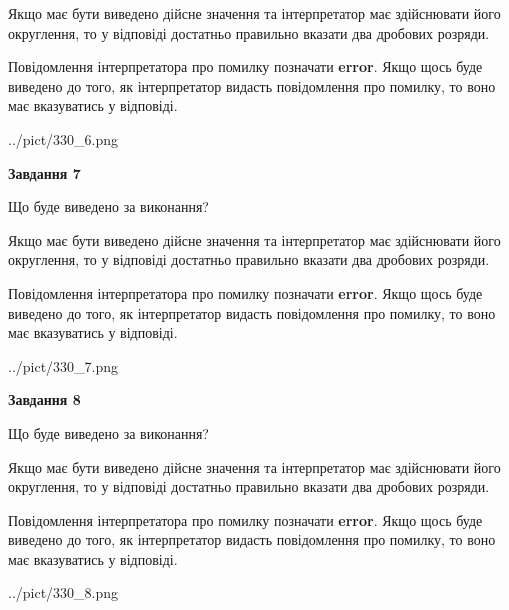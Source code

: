 \documentclass[12pt, ukrainian]{article}
\begin{document}
{\begin {Large}
Якщо має бути виведено дійсне значення та інтерпретатор має здійснювати його округлення, 
то у відповіді достатньо правильно вказати два дробових розряди.

Повідомлення інтерпретатора про помилку позначати \textbf{error}.
Якщо щось буде виведено до того, як інтерпретатор видасть повідомлення про помилку, 
то воно має вказуватись у відповіді. \par

\begin{center}
	{../pict/330_6.png}
\end{center}
\newpage

{\begin {center}\textbf{Завдання 7}\end {center}}\par
Що буде виведено за виконання? \par

Якщо має бути виведено дійсне значення та інтерпретатор має здійснювати його округлення, 
то у відповіді достатньо правильно вказати два дробових розряди.

Повідомлення інтерпретатора про помилку позначати \textbf{error}.
Якщо щось буде виведено до того, як інтерпретатор видасть повідомлення про помилку, 
то воно має вказуватись у відповіді. \par

\begin{center}
	{../pict/330_7.png}
\end{center}
\newpage

{\begin {center}\textbf{Завдання 8}\end {center}}\par
Що буде виведено за виконання? \par

Якщо має бути виведено дійсне значення та інтерпретатор має здійснювати його округлення, 
то у відповіді достатньо правильно вказати два дробових розряди.

Повідомлення інтерпретатора про помилку позначати \textbf{error}.
Якщо щось буде виведено до того, як інтерпретатор видасть повідомлення про помилку, 
то воно має вказуватись у відповіді. \par

\begin{center}
	{../pict/330_8.png}
\end{center}
\newpage


\end{Large}}
\end{document}
